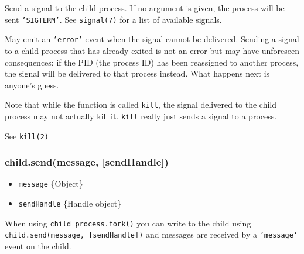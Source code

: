 Send a signal to the child process. If no argument is given, the process
will be sent \texttt{'SIGTERM'}. See \texttt{signal(7)} for a list of
available signals.

\begin{Shaded}
\begin{Highlighting}[]
 \NormalTok{,}
    \NormalTok{, [}\NormalTok{]);}

\NormalTok{(}\NormalTok{, } 
  \NormalTok{(}
\NormalTok{\});}

\NormalTok{(}\NormalTok{);}
\end{Highlighting}
\end{Shaded}

May emit an \texttt{'error'} event when the signal cannot be delivered.
Sending a signal to a child process that has already exited is not an
error but may have unforeseen consequences: if the PID (the process ID)
has been reassigned to another process, the signal will be delivered to
that process instead. What happens next is anyone's guess.

Note that while the function is called \texttt{kill}, the signal
delivered to the child process may not actually kill it. \texttt{kill}
really just sends a signal to a process.

See \texttt{kill(2)}

\subsubsection{child.send(message, {[}sendHandle{]})}

\begin{itemize}
\item
  \texttt{message} \{Object\}
\item
  \texttt{sendHandle} \{Handle object\}
\end{itemize}

When using \texttt{child\_process.fork()} you can write to the child
using \texttt{child.send(message, {[}sendHandle{]})} and messages are
received by a \texttt{'message'} event on the child.

